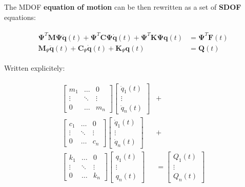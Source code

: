 \documentclass[10pt,b5paper,titlepage]{book}
\newcommand{\m}{\mathbf}
\newcommand{\M}{\pmb}
\newenvironment{eqarray}
{
    \begin{eqnarray}
        \begin{aligned}
}
{
        \end{aligned}
    \end{eqnarray}
}
\begin{document}
The MDOF \textbf{equation of motion} can be then rewritten as a set of \textbf{SDOF}
equations:

\begin{eqarray}
    \M{\Psi}^T \m{M} \M{\Psi} \ddot{\m{q}}(t) +
    \M{\Psi}^T \m{C} \M{\Psi} \dot{\m{q}}(t) +
    \M{\Psi}^T \m{K} \M{\Psi} \m{q}(t) &=
    \M{\Psi}^T \m{F}(t) \\
    \m{M}_{\Psi} \ddot{\m{q}}(t) +
    \m{C}_{\Psi} \dot{\m{q}}(t) +
    \m{K}_{\Psi} \m{q}(t) &= \m{Q}(t)
\end{eqarray}

Written explicitely:

\begin{eqarray}
    \begin{bmatrix}
        m_1 & \dots & 0 \\
        \vdots & \ddots & \vdots \\
        0 & \dots & m_n
    \end{bmatrix}
    \begin{bmatrix}
        \ddot{q}_1(t) \\
        \vdots \\
        \ddot{q}_n(t)
    \end{bmatrix} &+ \\
    \begin{bmatrix}
        c_1 & \dots & 0 \\
        \vdots & \ddots & \vdots \\
        0 & \dots & c_n
    \end{bmatrix}
    \begin{bmatrix}
        \dot{q}_1(t) \\
        \vdots \\
        \dot{q}_n(t)
    \end{bmatrix} &+ \\
    \begin{bmatrix}
        k_1 & \dots & 0 \\
        \vdots & \ddots & \vdots \\
        0 & \dots & k_n
    \end{bmatrix}
    \begin{bmatrix}
        q_1(t) \\
        \vdots \\
        q_n(t)
    \end{bmatrix} &=
    \begin{bmatrix}
        Q_1(t) \\
        \vdots \\
        Q_n(t)
    \end{bmatrix}
\end{eqarray}
\end{document}
